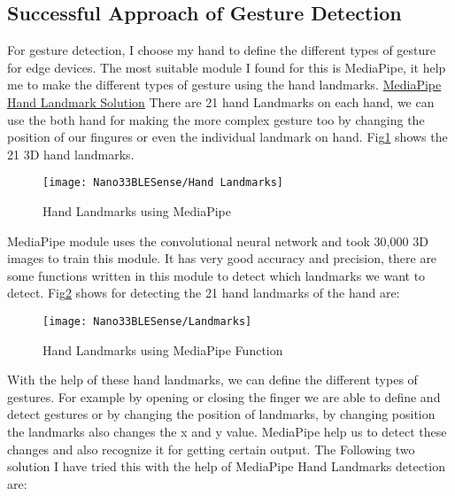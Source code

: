 \subsection{Successful Approach of Gesture Detection} 
For gesture detection, I choose my hand to define the different types of gesture for edge devices. The most suitable module I found for this is MediaPipe, it help me to make the different types of gesture using the hand landmarks. \href{https://google.github.io/mediapipe/solutions/hands.html}{MediaPipe Hand Landmark Solution} There are 21 hand Landmarks on each hand, we can use the both hand for making the more complex gesture too by changing the position of our fingures or even the individual landmark on hand. Fig\ref{Hand Landmarks using MediaPipe} shows the 21 3D hand landmarks.
\begin{figure}[h]
	\centering
	\texttt{[image: Nano33BLESense/Hand Landmarks]}
	\caption{Hand Landmarks using MediaPipe}
	\label{Hand Landmarks using MediaPipe}
\end{figure}
MediaPipe module uses the convolutional neural network and took 30,000 3D images to train this module. It has very good accuracy and precision, there are some functions written in this module to detect which landmarks we want to detect. Fig\ref{Hand Landmarks using MediaPipe Function} shows for detecting the 21 hand landmarks of the hand are:

\begin{figure}[h]
	\centering
	\texttt{[image: Nano33BLESense/Landmarks]}
	\caption{Hand Landmarks using MediaPipe Function}
	\label{Hand Landmarks using MediaPipe Function}
\end{figure}
With the help of these hand landmarks, we can define the different types of gestures. For example by opening or closing the finger we are able to define and detect gestures or by changing the position of landmarks, by changing position the landmarks also changes the x and y value. MediaPipe help us to detect these changes and also recognize it for getting certain output. The Following two solution I have tried this with the help of MediaPipe Hand Landmarks detection are:
